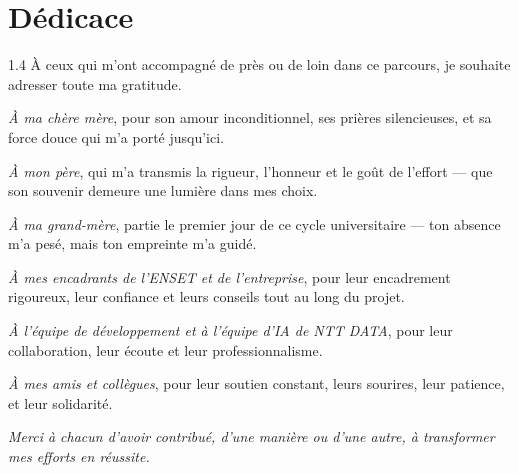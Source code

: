 \chapter*{Dédicace}
\vspace{-1.3cm}
\begin{spacing}{1.4}
	\lettrine[lines=3,lhang=0.1,loversize=0.15]{À}{} ceux qui m’ont accompagné de près ou de loin dans ce parcours, je souhaite adresser toute ma gratitude.
	
	\vspace{1em}
	
	\textit{À ma chère mère}, pour son amour inconditionnel, ses prières silencieuses, et sa force douce qui m’a porté jusqu’ici.
	
	\vspace{0.5em}
	
	\textit{À mon père}, qui m’a transmis la rigueur, l’honneur et le goût de l’effort — que son souvenir demeure une lumière dans mes choix.
	
	\vspace{0.5em}
	
	\textit{À ma grand-mère}, partie le premier jour de ce cycle universitaire — ton absence m’a pesé, mais ton empreinte m’a guidé.
	
	\vspace{0.5em}
	
	\textit{À mes encadrants de l’ENSET et de l’entreprise}, pour leur encadrement rigoureux, leur confiance et leurs conseils tout au long du projet.
	
	\vspace{0.5em}
	
	\textit{À l’équipe de développement et à l’équipe d'IA de NTT DATA}, pour leur collaboration, leur écoute et leur professionnalisme.
	
	\vspace{0.5em}
	
	\textit{À mes amis et collègues}, pour leur soutien constant, leurs sourires, leur patience, et leur solidarité.
	
	\vspace{1em}
	
	\textit{Merci à chacun d’avoir contribué, d’une manière ou d’une autre, à transformer mes efforts en réussite.}
\end{spacing}